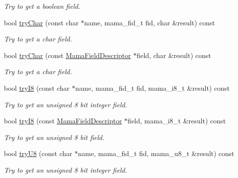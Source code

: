 \begin{DoxyCompactItemize}
\begin{DoxyCompactList}\small\item\em Try to get a boolean field. \item\end{DoxyCompactList}\item 
bool \hyperlink{classWombat_1_1MamaMsg_af750343c41da35bccb56a355d4cc6e12}{tryChar} (const char $\ast$name, mama\_\-fid\_\-t fid, char \&result) const 
\begin{DoxyCompactList}\small\item\em Try to get a char field. \item\end{DoxyCompactList}\item 
bool \hyperlink{classWombat_1_1MamaMsg_a70ac705d1634d03c8a1d3a1504b9e9d0}{tryChar} (const \hyperlink{classWombat_1_1MamaFieldDescriptor}{MamaFieldDescriptor} $\ast$field, char \&result) const 
\begin{DoxyCompactList}\small\item\em Try to get a char field. \item\end{DoxyCompactList}\item 
bool \hyperlink{classWombat_1_1MamaMsg_a0b8113df59fbd274e7ad0e5a2786ec54}{tryI8} (const char $\ast$name, mama\_\-fid\_\-t fid, mama\_\-i8\_\-t \&result) const 
\begin{DoxyCompactList}\small\item\em Try to get an unsigned 8 bit integer field. \item\end{DoxyCompactList}\item 
bool \hyperlink{classWombat_1_1MamaMsg_ac05be633c3737f9bdb3feccee8aab2e6}{tryI8} (const \hyperlink{classWombat_1_1MamaFieldDescriptor}{MamaFieldDescriptor} $\ast$field, mama\_\-i8\_\-t \&result) const 
\begin{DoxyCompactList}\small\item\em Try to get an unsigned 8 bit field. \item\end{DoxyCompactList}\item 
bool \hyperlink{classWombat_1_1MamaMsg_a320d1e1e35a76f9ea1a2c610a3f6d678}{tryU8} (const char $\ast$name, mama\_\-fid\_\-t fid, mama\_\-u8\_\-t \&result) const 
\begin{DoxyCompactList}\small\item\em Try to get an unsigned 8 bit integer field. \item\end{DoxyCompactList}\item 

\end{DoxyCompactItemize}
